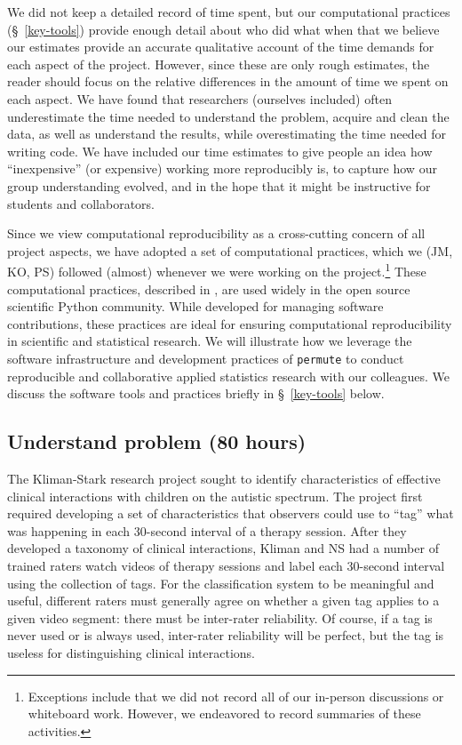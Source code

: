 \documentclass[]{article}
\begin{document}
We did not keep a detailed record of time spent, but
our computational practices (\S~\ref{key-tools}) provide enough detail about
who did what when that we believe our estimates provide an accurate qualitative
account of the time demands for each aspect of the project.
However, since these are only rough estimates, the reader should focus on the
relative differences in the amount of time we spent on each aspect.
We have found that researchers (ourselves included) often underestimate the
time needed to understand the problem, acquire and clean the data, as well as
understand the results, while overestimating the time needed for writing code.
We have included our time estimates to give people an idea how ``inexpensive''
(or expensive) working more reproducibly is, to capture how our group
understanding evolved, and in the  hope that it might be instructive for
students and collaborators.

Since we view computational reproducibility as a cross-cutting concern of all
project aspects, we have adopted a set of computational practices, which we
(JM, KO, PS) followed (almost) whenever we were working on the
project.\footnote{
Exceptions include that we did not record all of our
in-person discussions or whiteboard work.  
However, we endeavored to record summaries of these activities.
}
These computational practices, described in \citet{millman2014developing},
are used widely in the open source scientific Python community.
While developed for managing software contributions, these practices are ideal
for ensuring computational reproducibility in scientific and statistical
research.
We will illustrate how we leverage the software infrastructure and development
practices of \texttt{permute} to conduct reproducible and collaborative applied
statistics research with our colleagues.
We discuss the software tools and practices briefly in \S~\ref{key-tools} below.

\subsection{Understand problem (80 hours)}
The Kliman-Stark research project sought to identify characteristics of 
effective clinical interactions with children on the autistic spectrum.
The project first required developing a set of characteristics that observers
could use to ``tag'' what was happening in each 30-second interval of a 
therapy session.
After they developed a taxonomy of clinical interactions, Kliman and NS had a 
number of trained raters watch videos of therapy sessions and label each 
30-second interval using the collection of tags.
For the classification system to be meaningful and useful, different
raters must generally agree on whether a given tag applies to a given video segment:
there must be inter-rater reliability.
Of course, if a tag is never used or is always used, inter-rater reliability will be perfect,
but the tag is useless for distinguishing clinical interactions.
\end{document}
